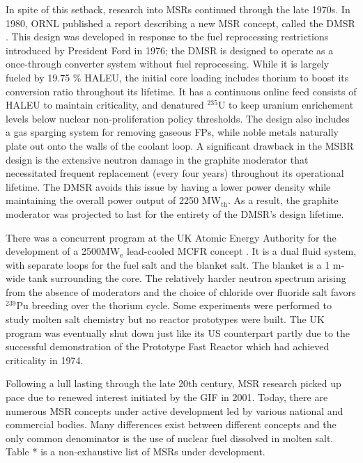 In spite of this setback, research into \glspl{MSR} continued through the late
1970s. In 1980, \gls{ORNL} published a report describing a new \gls{MSR}
concept, called the \gls{DMSR} \cite{gehin_liquid_2016}. This design was
developed in response to the fuel reprocessing restrictions introduced by
President Ford in 1976; the \gls{DMSR} is designed to operate as a
once-through converter system without fuel reprocessing. While it is largely
fueled by 19.75 \% \gls{HALEU}, the initial core loading includes thorium to
boost its conversion ratio throughout its lifetime. It has a continuous
online feed consists of \gls{HALEU} to maintain criticality, and denatured
$^{235}$U to keep uranium enrichement levels below nuclear non-proliferation
policy thresholds. The design also includes a gas sparging system for removing
gaseous \glspl{FP}, while noble metals naturally plate out onto the walls of
the coolant loop. A significant drawback in the \gls{MSBR} design is the
extensive neutron damage in the graphite moderator that necessitated frequent
replacement (every four years) throughout its operational lifetime. The
\gls{DMSR} avoids this issue by having a lower power density while maintaining
the overall power output of 2250 MW$_{\text{th}}$. As a result, the graphite
moderator was projected to last for the entirety of the \gls{DMSR}'s design
lifetime.

There was a concurrent program at the UK Atomic Energy Authority for the
development of a 2500MW$_{\text{e}}$ lead-cooled
\gls{MCFR} concept \cite{smith_assessment_1974}. It is a dual fluid system,
with separate loops for the fuel salt and the blanket salt. The blanket is a
1 m-wide tank surrounding the core. The relatively harder neutron spectrum
arising from the absence of moderators and the choice of chloride over
fluoride salt favors $^{239}$Pu breeding over the thorium cycle. Some
experiments were performed to study molten salt chemistry but no reactor
prototypes were built. The UK program was eventually shut down just like its
US counterpart partly due to the successful demonstration of the Prototype
Fast Reactor which had achieved criticality in 1974.

Following a lull lasting through the late 20th century, \gls{MSR} research
picked up pace due to renewed interest initiated by the \gls{GIF} in 2001.
Today, there are numerous \gls{MSR} concepts under active development led by
various national and commercial bodies. Many differences exist between
different concepts and the only common denominator is the use of nuclear fuel
dissolved in molten salt. Table * is a non-exhaustive list of \glspl{MSR}
under development.

